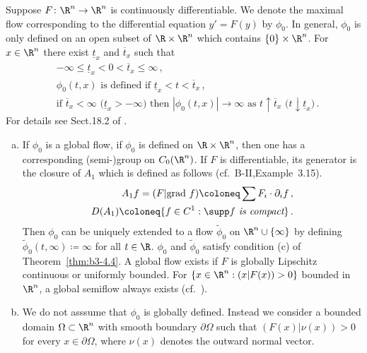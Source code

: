 \begin{example}\label{ex:b3-4.6}
	Suppose $F \colon \R^n \to \R^n$ is continuously differentiable.
	We denote the maximal flow corresponding to the differential equation $y' = F(y)$ by $\phi_{0}$.
	In general, $\phi_{0}$ is only defined on an open subset of $\R \times \R^n$ which contains $\{0\} \times \R^n$.
	For $x \in \R^n$ there exist $\underline{t}_{x}$ and $\overline{t}_{x}$ such that
	\begin{equation}\label{eq:b3-4.11}
		\begin{aligned}
			&-\infty \leq \underline{t}_{x} < 0 < \overline{t}_{x} \leq \infty\,, \\
			&\phi_{0}(t,x) \text{ is defined if } \underline{t}_{x} < t < \overline{t}_{x}\,, \\
			&\text{if } \overline{t}_{x} < \infty \text{ (}\underline{t}_{x} > -\infty\text{)} \text{ then } |\phi_{0}(t,x)| \to \infty \text{ as } t\uparrow\overline{t}_{x} \text{ (}t\downarrow\underline{t}_{x}\text{)}\,.
		\end{aligned}
	\end{equation}
	For details see Sect.18.2 of \citet{dieudonne:1971}.
	\begin{enumerate}[(a), wide]
	\item
	If $\phi_{0}$ is a global flow, \ie if $\phi_{0}$ is defined on $\R \times \R^n$, then one has a corresponding (semi-)group on $C_{0}(\R^n)$.
	If $F$ is differentiable, its generator is the closure of $A_{1}$ which is defined as follows (cf.\ B-II,Example~3.15).
	\begin{equation}\label{eq:b3-4.12}
		\begin{aligned}
			A_{1}f = (F|\text{grad }f) \coloneq \sum F_{i} \cdot \partial_{i}f \,, \\
			D(A_{1}) \coloneq \{f \in C^1 : \supp f \textit{ is compact}\}\,.
		\end{aligned}
	\end{equation}
	Then $\phi_{0}$ can be uniquely extended to a flow $\tilde{\phi}_{0}$ on $\R^n\cup\{\infty\}$ by defining $\tilde{\phi}_{0}(t,\infty) \coloneq \infty$ for all $t \in \R$.
	$\phi_{0}$ and $\tilde{\phi}_{0}$ satisfy condition (c) of Theorem~\ref{thm:b3-4.4}.
%
A global flow exists if $F$ is globally Lipschitz continuous or uniformly bounded. For $\{x \in \R^n : (x|F(x)) > 0\}$ bounded in $\R^n$, a global semiflow always exists (cf.\ \citet[Section~5.2]{deimling:1977}).
	\item 
	We do not asssume that  $\phi_0$ is globally defined.
	Instead we consider a bounded domain $\Omega \subset \R^n$ with smooth boundary $\partial\Omega$ such that $(F(x)|\nu(x)) > 0$ for every $x \in \partial\Omega$, where $\nu(x)$ denotes the outward normal vector.
	

\end{enumerate}
\end{example}
